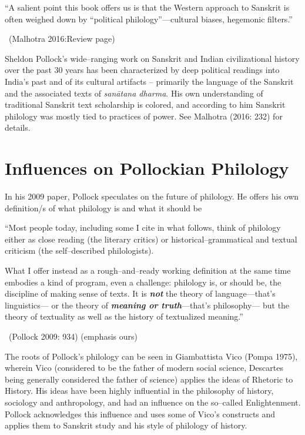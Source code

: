 \begin{myquote}
“A salient point this book offers us is that the Western approach to Sanskrit is often weighed down by “political philology”—cultural biases, hegemonic filters.”

~\hfill (Malhotra 2016:Review page)
\end{myquote}

Sheldon Pollock’s wide–ranging work on Sanskrit and Indian civilizational history over the past 30 years has been characterized by deep political readings into India’s past and of its cultural artifacts – primarily the language of the Sanskrit and the associated texts of \textit{sanātana dharma}. His own understanding of traditional Sanskrit text scholarship is colored, and according to him Sanskrit philology was mostly tied to practices of power. See Malhotra (2016: 232) for details.


\section*{Influences on Pollockian Philology}

In his 2009 paper, Pollock speculates on the future of philology. He offers his own definition/s of what philology is and what it should be

\begin{myquote}
“Most people today, including some I cite in what follows, think of philology either as close reading (the literary critics) or historical–grammatical and textual criticism (the self–described philologists).
\end{myquote}

\begin{myquote}
What I offer instead as a rough–and–ready working definition at the same time embodies a kind of program, even a challenge: philology is, or should be, the discipline of making sense of texts. It is \textbf{\textit{not}} the theory of language—that’s linguistics— or the theory of \textbf{\textit{meaning or truth}}—that’s philosophy— but the theory of textuality as well as the history of textualized meaning.”

~\hfill (Pollock 2009: 934) (emphasis ours)
\end{myquote}

The roots of Pollock’s philology can be seen in Giambattista Vico (Pompa 1975), wherein Vico (considered to be the father of modern social science, Descartes being generally considered the father of science) applies the ideas of Rhetoric to History. His ideas have been highly influential in the philosophy of history, sociology and anthropology, and had an influence on the so–called Enlightenment. Pollock acknowledges this influence and uses some of Vico’s constructs and applies them to Sanskrit study and his style of philology of history.

